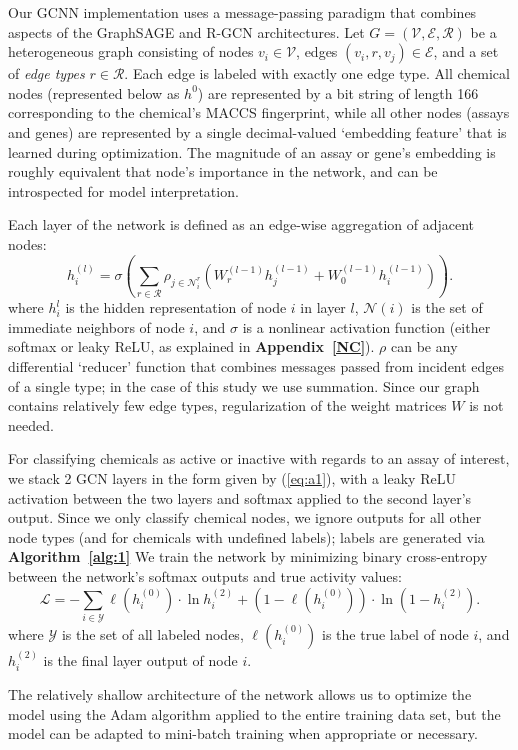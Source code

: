 \documentclass{ws-procs11x85}
\begin{document}
\label{GCNN}
Our GCNN implementation uses a message-passing paradigm that combines aspects of the GraphSAGE and R-GCN architectures.
Let $G = (\mathcal{V}, \mathcal{E}, \mathcal{R})$ be a heterogeneous graph consisting of nodes $v_i \in \mathcal{V}$, edges $(v_i, r, v_j)\in\mathcal{E}$, and a set of \textit{edge types} $r\in\mathcal{R}$.
Each edge is labeled with exactly one edge type.
All chemical nodes (represented below as $h^0$) are represented by a bit string of length 166 corresponding to the chemical's MACCS fingerprint, while all other nodes (assays and genes) are represented by a single decimal-valued `embedding feature' that is learned during optimization.
The magnitude of an assay or gene's embedding is roughly equivalent that node's importance in the network, and can be introspected for model interpretation.

Each layer of the network is defined as an edge-wise aggregation of adjacent nodes:
\begin{equation}
   h_i^{(l)} = \sigma \left(\sum_{r\in\mathcal{R}}\rho_{j\in\mathcal{N}_i^r}\left(W_r^{(l-1)} h_j^{(l-1)} + W_0^{(l-1)} h_i^{(l-1)}\right) \right).\label{eq:a1}
\end{equation}
where $h_i^l$ is the hidden representation of node $i$ in layer $l$, $\mathcal{N}(i)$ is the set of immediate neighbors of node $i$, and $\sigma$ is a nonlinear activation function (either softmax or leaky ReLU, as explained in \textbf{Appendix~\ref{NC}}).
$\rho$ can be any differential `reducer' function that combines messages passed from incident edges of a single type; in the case of this study we use summation.
Since our graph contains relatively few edge types, regularization of the weight matrices $W$ is not needed.

\label{NC}
For classifying chemicals as active or inactive with regards to an assay of interest, we stack 2 GCN layers in the form given by (\ref{eq:a1}), with a leaky ReLU activation between the two layers and softmax applied to the second layer's output.
Since we only classify chemical nodes, we ignore outputs for all other node types (and for chemicals with undefined labels); labels are generated via \textbf{Algorithm~\ref{alg:1}}
We train the network by minimizing binary cross-entropy between the network's softmax outputs and true activity values:
\begin{equation}
   \mathcal{L} = -\sum_{i\in\mathcal{Y}}
   \ell(h_i^{(0)}) \cdot\ln h_{i}^{(2)} +
   (1 - \ell(h_i^{(0)})) \cdot\ln (1 - h_{i}^{(2)}).\label{eq:b1}
\end{equation}
where $\mathcal{Y}$ is the set of all labeled nodes, $\ell(h_i^{(0)})$ is the true label of node $i$, and $h_i^{(2)}$ is the final layer output of node $i$.

The relatively shallow architecture of the network allows us to optimize the model using the Adam algorithm applied to the entire training data set, but the model can be adapted to mini-batch training when appropriate or necessary.



\end{document}
